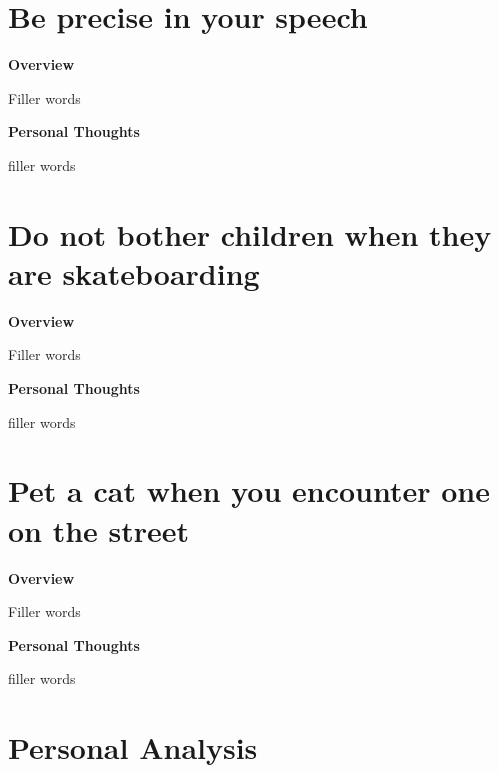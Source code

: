\documentclass{article}
\begin{document}
\section{Be precise in your speech}
        \begin{multicols}{2}
        \begin{center}
            \textbf{Overview}
        \end{center}
        
        Filler words 

        \begin{center}
            \textbf{Personal Thoughts}
        \end{center}
        
        filler words
    \end{multicols}
    
\section{Do not bother children when they are skateboarding}
        \begin{multicols}{2}
        \begin{center}
            \textbf{Overview}
        \end{center}
        
        Filler words 

        \begin{center}
            \textbf{Personal Thoughts}
        \end{center}
        
        filler words
    \end{multicols}
    
\section{Pet a cat when you encounter one on the street}
        \begin{multicols}{2}
        \begin{center}
        \textbf{Overview}
        \end{center}
        
        Filler words 

        \begin{center}
            \textbf{Personal Thoughts}
        \end{center}
        
        filler words
    \end{multicols}
\section{Personal Analysis}
\end{document}
